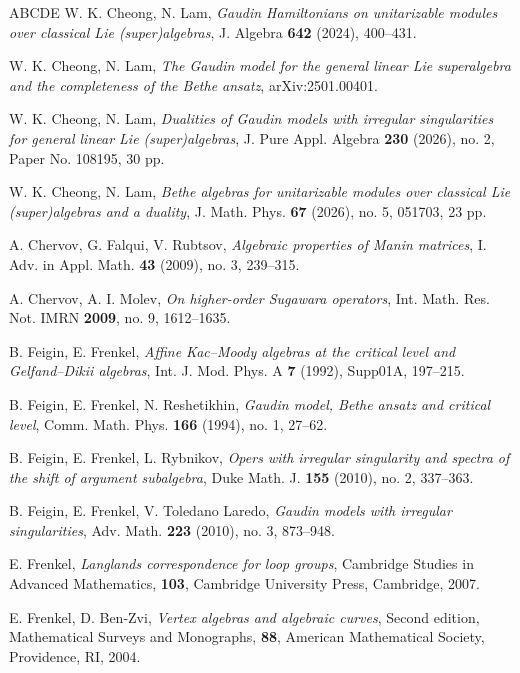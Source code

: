 \documentclass[11pt, reqno]{amsart}
\theoremstyle{definition}
\theoremstyle{remark}
\numberwithin{equation}{section}
\begin{document}
\begin{thebibliography}{ABCDE}
 W. K. Cheong, N. Lam, \emph{Gaudin Hamiltonians on unitarizable modules over classical Lie (super)algebras}, J. Algebra \textbf{642} (2024), 400--431.

 W. K. Cheong, N. Lam, \emph{The Gaudin model for the general linear Lie superalgebra and the completeness of the Bethe ansatz}, arXiv:2501.00401.

 W. K. Cheong, N. Lam, \emph{Dualities of Gaudin models with irregular singularities for general linear Lie (super)algebras}, J. Pure Appl. Algebra \textbf{230} (2026), no. 2, Paper No. 108195, 30 pp.

 W. K. Cheong, N. Lam, \emph{Bethe algebras for unitarizable modules over classical Lie (super)algebras and a duality}, J. Math. Phys. \textbf{67} (2026), no. 5, 051703, 23 pp.

 A. Chervov, G. Falqui, V. Rubtsov, \emph{Algebraic properties of Manin matrices}, I. Adv. in Appl. Math. \textbf{43} (2009), no. 3, 239--315.

 A. Chervov, A. I. Molev, \emph{On higher-order Sugawara operators}, Int. Math. Res. Not. IMRN \textbf{2009}, no. 9, 1612--1635.

 B. Feigin, E. Frenkel, \emph{Affine Kac--Moody algebras at the critical level and Gelfand--Dikii algebras}, Int. J. Mod. Phys. A \textbf{7} (1992), Supp01A, 197--215.

 B. Feigin, E. Frenkel, N. Reshetikhin, \emph{Gaudin model, Bethe ansatz and critical level}, Comm. Math. Phys. \textbf{166} (1994), no. 1, 27--62.

 B. Feigin, E. Frenkel, L. Rybnikov, \emph{Opers with irregular singularity and spectra of the shift of argument subalgebra}, Duke Math. J. \textbf{155} (2010), no. 2, 337--363.

 B. Feigin, E. Frenkel, V. Toledano Laredo, \emph{Gaudin models with irregular singularities}, Adv. Math. \textbf{223} (2010), no. 3, 873--948.

 E. Frenkel, \emph{Langlands correspondence for loop groups}, Cambridge Studies in Advanced Mathematics, \textbf{103}, Cambridge University Press, Cambridge, 2007.

 E. Frenkel, D. Ben-Zvi, \emph{Vertex algebras and algebraic curves}, Second edition, Mathematical Surveys and Monographs, \textbf{88}, American Mathematical Society, Providence, RI, 2004.


\end{thebibliography}
\end{document}
